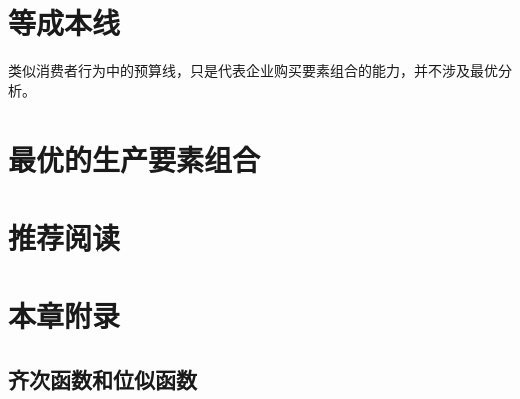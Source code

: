\section{等成本线}

类似消费者行为中的预算线，只是代表企业购买要素组合的能力，并不涉及最优分析。

\section{最优的生产要素组合}
\label{sec:optimum-input-choice}

\section*{推荐阅读}


\newpage
\section*{本章附录}
\label{sec:appendix-production-functions}

\subsection*{齐次函数和位似函数}